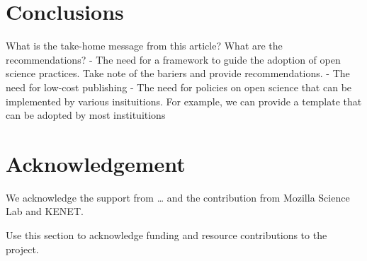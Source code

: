 \section*{Conclusions}\label{conclusions}

What is the take-home message from this article? What are the
recommendations? - The need for a framework to guide the adoption of
open science practices. Take note of the bariers and provide
recommendations. - The need for low-cost publishing - The need for
policies on open science that can be implemented by various
insituitions. For example, we can provide a template that can be adopted
by most instituitions

\section{Acknowledgement}\label{acknowledgement}

We acknowledge the support from \ldots{} and the contribution from
Mozilla Science Lab and KENET.

Use this section to acknowledge funding and resource contributions to
the project.
